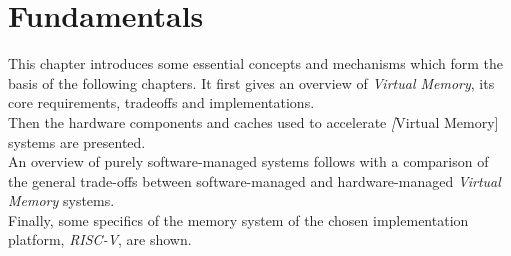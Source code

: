 \chapter{Fundamentals} %
\label{chap:fund}

%


This chapter introduces some essential concepts and mechanisms which form the basis of the following
chapters. It first gives an overview of \textit{Virtual Memory}, its core requirements,
tradeoffs and implementations.\\
Then the hardware components and caches used to accelerate \textit[Virtual Memory] systems are
presented.\\
An overview of purely software-managed systems follows with a comparison of the general trade-offs
between software-managed and hardware-managed \textit{Virtual Memory} systems.\\
Finally, some specifics of the memory system of the chosen implementation platform, \textit{RISC-V},
are shown.

